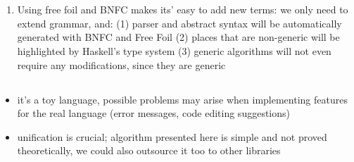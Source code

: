 \chapter{}
\label{chap:evaluation}



\section{}

\begin{enumerate}
  \item Using free foil and BNFC makes its' easy to add new terms: we only need to extend grammar, and: (1) parser and abstract syntax will be automatically generated with BNFC and Free Foil (2) places that are non-generic will be highlighted by Haskell's type system (3) generic algorithms will not even require any modifications, since they are generic
\end{enumerate}

\section{}

\begin{itemize}
  \item it's a toy language, possible problems may arise when implementing features for the real language (error messages, code editing suggestions)
  \item unification is crucial; algorithm presented here is simple and not proved theoretically, we could also outsource it too to other libraries
\end{itemize}

